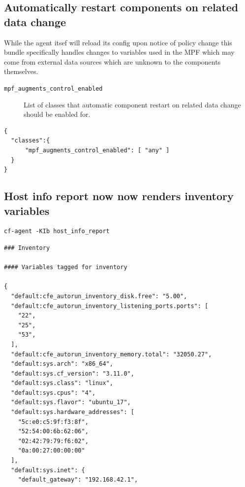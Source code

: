 \documentclass[11pt]{article}
\begin{document}
\subsection*{Automatically restart components on related data change}
\label{sec:org765b9eb}

\begin{NOTES}
While the agent itsef will reload its config upon notice of policy change this
bundle specifically handles changes to variables used in the MPF which may come
from external data sources which are unknown to the components themselves.
\end{NOTES}

\begin{description}
\item[{\texttt{mpf\_augments\_control\_enabled}}] List of classes that automatic component
restart on related data change should be enabled for.
\end{description}

\begin{verbatim}
{
  "classes":{
      "mpf_augments_control_enabled": [ "any" ]
  }
}
\end{verbatim}

\subsection*{Host info report now now renders inventory variables}
\label{sec:org4a19fb4}

\begin{verbatim}
cf-agent -KIb host_info_report
\end{verbatim}

\begin{verbatim}
### Inventory

#### Variables tagged for inventory

{
  "default:cfe_autorun_inventory_disk.free": "5.00",
  "default:cfe_autorun_inventory_listening_ports.ports": [
    "22",
    "25",
    "53",
  ],
  "default:cfe_autorun_inventory_memory.total": "32050.27",
  "default:sys.arch": "x86_64",
  "default:sys.cf_version": "3.11.0",
  "default:sys.class": "linux",
  "default:sys.cpus": "4",
  "default:sys.flavor": "ubuntu_17",
  "default:sys.hardware_addresses": [
    "5c:e0:c5:9f:f3:8f",
    "52:54:00:6b:62:06",
    "02:42:79:79:f6:02",
    "0a:00:27:00:00:00"
  ],
  "default:sys.inet": {
    "default_gateway": "192.168.42.1",
\end{verbatim}
\end{document}
